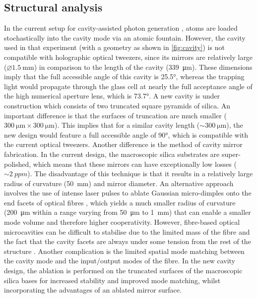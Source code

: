 \documentclass[../Thesis-IJspeert.tex]{subfiles}
\begin{document}
\subsection{Structural analysis}
In the current setup for cavity-assisted photon generation \cite{Barrett2019}, atoms are loaded stochastically into the cavity mode via an atomic fountain. However, the cavity used in that experiment (with a geometry as shown in \autoref{fig:cavity}) is not compatible with holographic optical tweezers, since its mirrors are relatively large ($\diameter \SI{1.5}{\milli\meter}$) in comparison to the length of the cavity (\SI{339}{\micro\meter}). These dimensions imply that the full accessible angle of this cavity is \ang{25.5}, whereas the trapping light would propagate through the glass cell at nearly the full acceptance angle of the high numerical aperture lens, which is \ang{73.7}. A new cavity is under construction which consists of two truncated square pyramids of silica. An important difference is that the surfaces of truncation are much smaller ($\SI{300}{\micro\meter}\times\SI{300}{\micro\meter}$). This implies that for a similar cavity length ($\sim\SI{300}{\micro\meter}$), the new design would feature a full accessible angle of \ang{90}, which is compatible with the current optical tweezers. Another difference is the method of cavity mirror fabrication. In the current design, the macroscopic silica substrates are super-polished, which means that these mirrors can have exceptionally low losses ($\sim\SI{2}{ppm}$). The disadvantage of this technique is that it results in a relatively large radius of curvature (\SI{50}{\milli\meter}) and mirror diameter. An alternative approach involves the use of intense  laser pulses to ablate Gaussian micro-dimples onto the end facets of optical fibres \cite{Hunger2010}, which yields a much smaller radius of curvature (\SI{200}{\micro\meter} within a range varying from \SI{50}{\micro\meter} to \SI{1}{\milli\meter}) that can enable a smaller mode volume and therefore higher cooperativity. However, fibre-based optical microcavities can be difficult to stabilise due to the limited mass of the fibre and the fact that the cavity facets are always under some tension from the rest of the structure \cite{Janitz2017}. Another complication is the limited spatial mode matching between the cavity mode and the input/output modes of the fibre. In the new cavity design, the ablation is performed on the truncated surfaces of the macroscopic silica bases for increased stability and improved mode matching, whilst incorporating the advantages of an ablated mirror surface.
\end{document}
